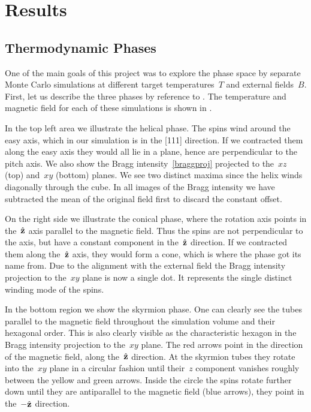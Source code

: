 %
\chapter{Results}\label{chap:2}
%
%
\section{Thermodynamic Phases}\label{sec:phases}
%
One of the main goals of this project was to explore the phase space by separate
Monte Carlo simulations at different target temperatures~$T$ and external
fields~$B$. First, let us describe the three phases by reference to
. The temperature and magnetic field for each of these
simulations is shown in .

In the top left area we illustrate the helical phase. The spins wind around the
easy axis, which in our simulation is in the [111] direction.  If we contracted
them along the easy axis they would all lie in a plane, hence are perpendicular
to the pitch axis. We also show the Bragg intensity~\eqref{braggproj} projected
to the~$xz$ (top) and~$xy$ (bottom) planes. We see two distinct maxima since the
helix winds diagonally through the cube. In all images of the Bragg intensity we
have subtracted the mean of the original field first to discard the constant
offset.

On the right side we illustrate the conical phase, where the rotation axis
points in the~$\hat{\mathbf{z}}$ axis parallel to the magnetic field. Thus the spins are not
perpendicular to the axis, but have a constant component in the~$\hat{\mathbf{z}}$ direction.
If we contracted them along the~$\hat{\mathbf{z}}$ axis, they would form a cone, which is
where the phase got its name from. Due to the alignment with the external field
the Bragg intensity projection to the~$xy$ plane is now a single dot. It
represents the single distinct winding mode of the spins.

In the bottom region we show the skyrmion phase. One can clearly see the tubes
parallel to the magnetic field throughout the simulation volume and their
hexagonal order. This is also clearly visible as the characteristic hexagon in
the Bragg intensity projection to the~$xy$ plane. The red arrows point in the
direction of the magnetic field, \ie{} along the~$\hat{\mathbf{z}}$ direction. At the
skyrmion tubes they rotate into the~$xy$ plane in a circular fashion until
their~$z$ component vanishes roughly between the yellow and green arrows. Inside
the circle the spins rotate further down until they are antiparallel to the
magnetic field (blue arrows), \ie{} they point in the~$-\hat{\mathbf{z}}$ direction.

